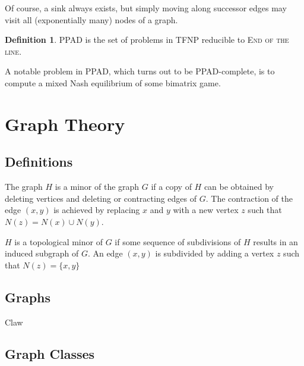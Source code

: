 \documentclass[]{article}
\theoremstyle{definition}
\newtheorem{definition}{Definition}[section]
\begin{document}
Of course, a sink always exists, but simply moving along successor edges may visit all (exponentially many) nodes of a graph.

\begin{definition}
	PPAD is the set of problems in TFNP reducible to \textsc{End of the line.}
\end{definition}

A notable problem in PPAD, which turns out to be PPAD-complete, is to compute a mixed Nash equilibrium of some bimatrix game.

\section{Graph Theory}
\subsection{Definitions}
The graph $H$ is a minor of the graph $G$ if a copy of $H$ can be obtained by deleting vertices and deleting or contracting edges of $G$. The contraction of the edge $(x,y)$ is achieved by replacing $x$ and $y$ with a new vertex $z$ such that $N(z)=N(x) \cup N(y)$.

$H$ is a topological minor of $G$ if some sequence of subdivisions of $H$ results in an induced subgraph of $G$. An edge $(x,y)$ is subdivided by adding a vertex $z$ such that $N(z)= \{x,y\}$ 
\subsection{Graphs}
Claw
\subsection{Graph Classes}
\end{document}
